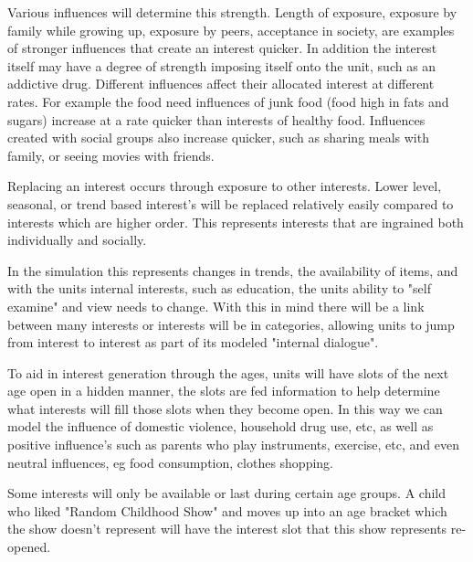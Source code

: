Various influences will determine this strength. Length of exposure, exposure by family while growing up, exposure by peers, acceptance in society, are examples of stronger influences that create an interest quicker. In addition the interest itself may have a degree of strength imposing itself onto the unit, such as an addictive drug. Different influences affect their allocated interest at different rates. For example the food need influences of junk food (food high in fats and sugars) increase at a rate quicker than interests of healthy food. Influences created with social groups also increase quicker, such as sharing meals with family, or seeing movies with friends.


Replacing an interest occurs through exposure to other interests. Lower level, seasonal, or trend based interest's will be replaced relatively easily compared to interests which are higher order. This represents interests that are ingrained both individually and socially. 

In the simulation this represents changes in trends, the availability of items, and with the units internal interests, such as education, the units ability to "self examine" and view needs to change. With this in mind there will be a link between many interests or interests will be in categories, allowing units to jump from interest to interest as part of its modeled "internal dialogue".

To aid in interest generation through the ages, units will have slots of the next age open in a hidden manner, the slots are fed information to help determine what interests will fill those slots when they become open. In this way we can model the influence of domestic violence, household drug use, etc, as well as positive influence's such as parents who play instruments, exercise, etc, and even neutral influences, eg food consumption, clothes shopping.

Some interests will only be available or last during certain age groups. A child who liked "Random Childhood Show" and moves up into an age bracket which the show doesn't represent will have the interest slot that this show represents re-opened. 


